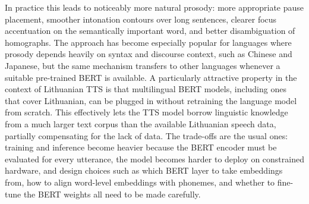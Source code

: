 \documentclass[
         english, %
    monochrome, %
]{VUMIFSEMasterThesis}
\begin{document}
In practice this leads to noticeably more natural prosody: more appropriate pause placement, smoother intonation contours over long sentences, clearer focus accentuation on the semantically important word, and better disambiguation of homographs.
The approach has become especially popular for languages where prosody depends heavily on syntax and discourse context, such as Chinese and Japanese, but the same mechanism transfers to other languages whenever a suitable pre-trained BERT is available.
A particularly attractive property in the context of Lithuanian TTS is that multilingual BERT models, including ones that cover Lithuanian, can be plugged in without retraining the language model from scratch.
This effectively lets the TTS model borrow linguistic knowledge from a much larger text corpus than the available Lithuanian speech data, partially compensating for the lack of data.
The trade-offs are the usual ones: training and inference become heavier because the BERT encoder must be evaluated for every utterance, the model becomes harder to deploy on constrained hardware, and design choices such as which BERT layer to take embeddings from, how to align word-level embeddings with phonemes, and whether to fine-tune the BERT weights all need to be made carefully.




\printbibliography[heading=bibintoc]  %
\end{document}
